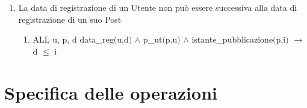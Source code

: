 \documentclass{article}
\begin{document}
\begin{enumerate}
    \item La data di registrazione di un Utente non può essere successiva alla data di registrazione di un suo Post
    \begin{enumerate}
        \item ALL u, p, d data\_reg$($u,d$)$ $\land$ p\_ut$($p,u$)$ $\land$ istante\_pubblicazione$($p,i$)$ $\rightarrow$ d $\leq$ i
    \end{enumerate}

\end{enumerate}

\newpage
\section{\label{sec:SpecificaOperazioni}Specifica delle operazioni}
\end{document}
